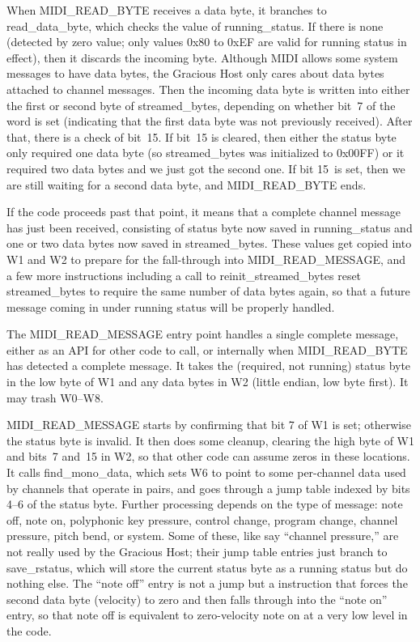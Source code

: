 When MIDI\_READ\_BYTE receives a data byte, it branches to read\_data\_byte,
which checks the value of running\_status.  If there is none (detected by
zero value; only values 0x80 to 0xEF are valid for running status in
effect), then it discards the incoming byte.  Although MIDI allows some
system messages to have data bytes, the Gracious Host only cares about data
bytes attached to channel messages.  Then the incoming data byte is written
into either the first or second byte of streamed\_bytes, depending on
whether bit~7 of the word is set (indicating that the first data byte was
not previously received).  After that, there is a check of bit~15.  If
bit~15 is cleared, then either the status byte only required one data byte
(so streamed\_bytes was initialized to 0x00FF) or it required two data bytes
and we just got the second one.  If bit 15~is set, then we are still waiting
for a second data byte, and MIDI\_READ\_BYTE ends.

If the code proceeds past that point, it means that a complete channel
message has just been received, consisting of status byte now saved in
running\_status and one or two data bytes now saved in streamed\_bytes. 
These values get copied into W1 and W2 to prepare for the fall-through into
MIDI\_READ\_MESSAGE, and a few more instructions including a call to
reinit\_streamed\_bytes reset streamed\_bytes to require the same number of
data bytes again, so that a future message coming in under running status
will be properly handled.

The MIDI\_READ\_MESSAGE entry point handles a single complete message,
either as an API for other code to call, or internally when MIDI\_READ\_BYTE
has detected a complete message.  It takes the (required, not running)
status byte in the low byte of W1 and any data bytes in W2 (little endian,
low byte first).  It may trash W0--W8.

MIDI\_READ\_MESSAGE starts by confirming that bit 7 of W1 is set; otherwise
the status byte is invalid.  It then does some cleanup, clearing the high
byte of W1 and bits~7 and~15 in W2, so that other code can assume zeros in
these locations.  It calls find\_mono\_data, which sets W6 to point to some
per-channel data used by channels that operate in pairs, and goes through a
jump table indexed by bits 4--6 of the status byte.  Further processing
depends on the type of message: note off, note on, polyphonic key pressure,
control change, program change, channel pressure, pitch bend, or system. 
Some of these, like say ``channel pressure,'' are not really used by the
Gracious Host; their jump table entries just branch to save\_rstatus, which
will store the current status byte as a running status but do nothing else. 
The ``note off'' entry is not a jump but a  instruction that
forces the second data byte (velocity) to zero and then falls through into
the ``note on'' entry, so that note off is equivalent to zero-velocity note
on at a very low level in the code.

